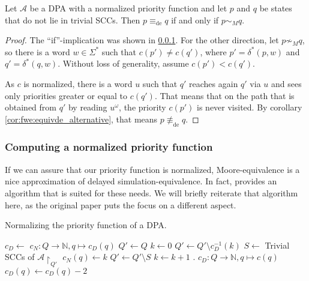 \begin{lem}
	Let $\mathcal{A}$ be a DPA with a normalized priority function and let $p$ and $q$ be states that do not lie in trivial SCCs. Then $p \equiv_\text{de} q$ if and only if $p \sim_M q$.
\end{lem}

\begin{proof}
	The \enquote{if}-implication was shown in \ref{}. For the other direction, let $p \not\sim_M q$, so there is a word $w \in \Sigma^*$ such that $c(p') \neq c(q')$, where $p' = \delta^*(p, w)$ and $q' = \delta^*(q, w)$. Without loss of generality, assume $c(p') < c(q')$.
	
	As $c$ is normalized, there is a word $u$ such that $q'$ reaches again $q'$ via $u$ and sees only priorities greater or equal to $c(q')$. That means that on the path that is obtained from $q'$ by reading $u^\omega$, the priority $c(p')$ is never visited. By corollary \ref{cor:fwe:equivde_alternative}, that means $p \not\equiv_\text{de} q$.
\end{proof}

\subsubsection{Computing a normalized priority function}
If we can assure that our priority function is normalized, Moore-equivalence is a nice approximation of delayed simulation-equivalence. In fact, \cite{} provides an algorithm that is suited for these needs. We will briefly reiterate that algorithm here, as the original paper puts the focus on a different aspect.

\begin{algorithm}
  \caption{Normalizing the priority function of a DPA.}
  \label{alg:fwe:normalize_c}
  \begin{algorithmic}[1]
      \State $c_D \gets $
      \State $c_N : Q \rightarrow \mathbb{N}, q \mapsto c_D(q)$
      \State $Q' \gets Q$
      \State $k \gets 0$
        \State $Q' \gets Q' \setminus c_D^{-1}(k)$
        \State $S \gets $ Trivial SCCs of $\mathcal{A}\upharpoonright_{Q'}$
          \State $c_N(q) \gets k$
        \EndFor
        \State $Q' \gets Q' \setminus S$
        \State $k \gets k+1$
      \EndWhile
      \State {}
    \EndFunction
    \Statex
      .
      \State $c_D : Q \rightarrow \mathbb{N}, q \mapsto c(q)$
            \State $c_D(q) \gets c_D(q) - 2$
          \EndFor
        \EndWhile
      \EndFor
      \State {}
    \EndFunction
  \end{algorithmic}
\end{algorithm}

